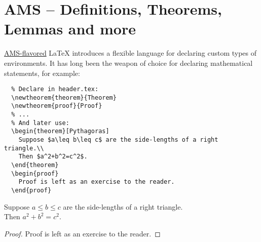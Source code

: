 \section{AMS -- Definitions, Theorems, Lemmas and more}
\href{https://en.wikipedia.org/wiki/AMS-LaTeX}{AMS-flavored} {\LaTeX} introduces a flexible language for declaring custom types of environments. It has long been the weapon of choice for declaring mathematical statements, for example:

\begin{lstlisting}
  % Declare in header.tex:
  \newtheorem{theorem}{Theorem}
  \newtheorem{proof}{Proof}
  % ...
  % And later use:
  \begin{theorem}[Pythagoras] 
    Suppose $a\leq b\leq c$ are the side-lengths of a right triangle.\\  
    Then $a^2+b^2=c^2$.
  \end{theorem}
  \begin{proof}
    Proof is left as an exercise to the reader.
  \end{proof}
\end{lstlisting}

  \begin{theorem}[Pythagoras] 
    Suppose $a\leq b\leq c$ are the side-lengths of a right triangle.\\  
    Then $a^2+b^2=c^2$.
  \end{theorem}
  \begin{proof}
    Proof is left as an exercise to the reader.
  \end{proof}
  
  